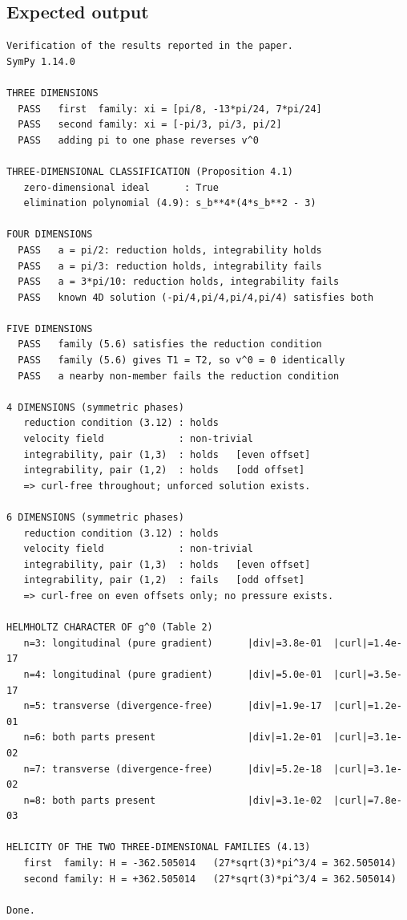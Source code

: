 \documentclass[11pt]{jfm}
\numberwithin{equation}{section}
\begin{document}
\subsection*{Expected output}
\begingroup
\small
\begingroup\small\begin{verbatim}
Verification of the results reported in the paper.
SymPy 1.14.0

THREE DIMENSIONS
  PASS   first  family: xi = [pi/8, -13*pi/24, 7*pi/24]
  PASS   second family: xi = [-pi/3, pi/3, pi/2]
  PASS   adding pi to one phase reverses v^0

THREE-DIMENSIONAL CLASSIFICATION (Proposition 4.1)
   zero-dimensional ideal      : True
   elimination polynomial (4.9): s_b**4*(4*s_b**2 - 3)

FOUR DIMENSIONS
  PASS   a = pi/2: reduction holds, integrability holds
  PASS   a = pi/3: reduction holds, integrability fails
  PASS   a = 3*pi/10: reduction holds, integrability fails
  PASS   known 4D solution (-pi/4,pi/4,pi/4,pi/4) satisfies both

FIVE DIMENSIONS
  PASS   family (5.6) satisfies the reduction condition
  PASS   family (5.6) gives T1 = T2, so v^0 = 0 identically
  PASS   a nearby non-member fails the reduction condition

4 DIMENSIONS (symmetric phases)
   reduction condition (3.12) : holds
   velocity field             : non-trivial
   integrability, pair (1,3)  : holds   [even offset]
   integrability, pair (1,2)  : holds   [odd offset]
   => curl-free throughout; unforced solution exists.

6 DIMENSIONS (symmetric phases)
   reduction condition (3.12) : holds
   velocity field             : non-trivial
   integrability, pair (1,3)  : holds   [even offset]
   integrability, pair (1,2)  : fails   [odd offset]
   => curl-free on even offsets only; no pressure exists.

HELMHOLTZ CHARACTER OF g^0 (Table 2)
   n=3: longitudinal (pure gradient)      |div|=3.8e-01  |curl|=1.4e-17
   n=4: longitudinal (pure gradient)      |div|=5.0e-01  |curl|=3.5e-17
   n=5: transverse (divergence-free)      |div|=1.9e-17  |curl|=1.2e-01
   n=6: both parts present                |div|=1.2e-01  |curl|=3.1e-02
   n=7: transverse (divergence-free)      |div|=5.2e-18  |curl|=3.1e-02
   n=8: both parts present                |div|=3.1e-02  |curl|=7.8e-03

HELICITY OF THE TWO THREE-DIMENSIONAL FAMILIES (4.13)
   first  family: H = -362.505014   (27*sqrt(3)*pi^3/4 = 362.505014)
   second family: H = +362.505014   (27*sqrt(3)*pi^3/4 = 362.505014)

Done.
\end{verbatim}\endgroup
\endgroup
\end{document}
